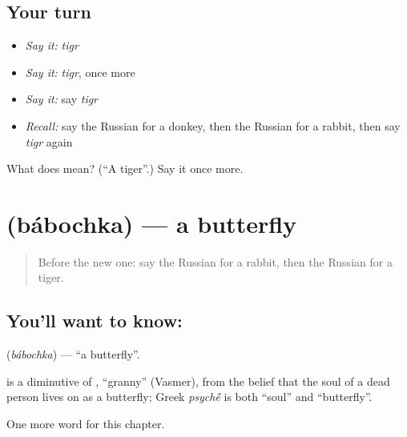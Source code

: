 \subsection*{Your turn}
\begin{itemize}
\raggedright
  \item \emph{Say it:} \emph{tigr}
  \item \emph{Say it:} \emph{tigr}, once more
  \item \emph{Say it:} say \emph{tigr}
  \item \emph{Recall:} say the Russian for a donkey, then the Russian for a rabbit, then say \emph{tigr} again
\end{itemize}

\begin{tcolorbox}[breakable,colback=teal!4,colframe=teal!35!black,title={Before you move on}]
What does  mean? (\textquotedblleft{}A tiger\textquotedblright{}.) Say it once more.
\end{tcolorbox}
\section[\texorpdfstring{\ru{бабочка} (bábochka)}{бабочка (bábochka)}]{ (bábochka) — a butterfly}

\label{lesson:RU-C117-butterfly}



\begin{quote}
Before the new one: say the Russian for a rabbit, then the Russian for a tiger.
\end{quote}

\subsection*{You'll want to know: }
\textbf{} (\emph{bábochka}) — \textquotedblleft{}a butterfly\textquotedblright{}.

\begin{cousinweb}
\textbf{} is a diminutive of \emph{}, \textquotedblleft{}granny\textquotedblright{} (Vasmer), from the belief that the soul of a dead person lives on as a butterfly; Greek \emph{psych\'{\={e}}} is both \textquotedblleft{}soul\textquotedblright{} and \textquotedblleft{}butterfly\textquotedblright{}.
\end{cousinweb}

\begin{grammarlens}[title={What you've built}]
One more word for this chapter.
\end{grammarlens}

